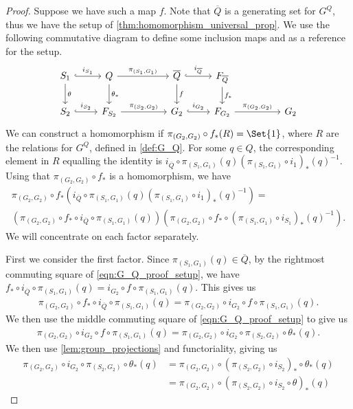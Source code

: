 \begin{proof}
	Suppose we have such a map $f$.
	Note that  $\overline{Q}$ is a generating set for  $G^Q$, thus we have the setup of \cref{thm:homomorphism_universal_prop}.
	We use the following commutative diagram to define some inclusion maps and as a reference for the setup.
	\begin{equation}
		\begin{tikzcd}
			S_1 \ar[d, "\theta"] \ar[r, hook, "i_{S_1}"] & Q \ar[d, "\theta_*"] \ar[rr, "\pi_{(S_1, G_1)}"] & & \overline{Q} \ar[d, "f"] \ar[r, hook, "i_{\overline{Q}}"] & F_{\overline{Q}} \ar[d, "f_*"]
			\\ S_2 \ar[r, hook, "i_{S_2}"] & F_{S_2} \ar[rr, "\pi_{(S_2, G_2)}"] & & G_2 \ar[r, hook, "i_{G_2}"] & F_{G_2} \ar[rr, "\pi_{(G_2, G_2)}"] & & G_2
		\end{tikzcd}
		\label{eqn:G_Q_proof_setup}
	\end{equation}
	We can construct a homomorphism if $\pi_{(G_2, G_2)} \circ f_*(R) = \Set{1}$, where $R$ are the relations for $G^Q$, defined in \cref{def:G_Q}.
	For some $q \in Q$, the corresponding element in $R$ equalling the identity is  $i_{\overline{Q}} \circ \pi_{(S_1,G_1)}(q)(\pi_{(S_1,G_1)} \circ i_1)_*(q)^{-1}$.
	Using that $\pi_{(G_2,G_2)} \circ f_*$ is a homomorphism, we have
	\begin{align*}
		\pi_{(G_2,G_2)} \circ f_* \left(i_{\overline{Q}} \circ \pi_{(S_1,G_1)}(q)(\pi_{(S_1,G_1)} \circ i_1)_*(q)^{-1}\right) =
		\\ \left(\pi_{(G_2,G_2)} \circ f_* \circ i_{\overline{Q}} \circ \pi_{(S_1,G_1)} (q)\right) \left( \pi_{(G_2,G_2)} \circ f_* \circ\left( \pi_{(S_1,G_1)} \circ i_{S_1}\right)_*(q)^{-1} \right).
	\end{align*}
	We will concentrate on each factor separately.

	First we consider the first factor.
	Since $\pi_{(S_1, G_1)}(q) \in \overline{Q}$, by the rightmost commuting square of \eqref{eqn:G_Q_proof_setup}, we have $f_* \circ i_{\overline{Q}} \circ \pi_{(S_1, G_1)}(q) = i_{G_2} \circ f \circ \pi_{(S_1,G_1)} (q)$.
	This gives us
	\begin{align*}
		\pi_{(G_2,G_2)} \circ f_* \circ i_{\overline{Q}} \circ \pi_{(S_1,G_1)} (q) = \pi_{(G_2,G_2)} \circ i_{G_2} \circ f \circ \pi_{(S_1,G_1)}(q).
	\end{align*}
	We then use the middle commuting square of \eqref{eqn:G_Q_proof_setup} to give us
	\begin{align*}
		\pi_{(G_2,G_2)} \circ i_{G_2} \circ f \circ \pi_{(S_1,G_1)}(q) = \pi_{(G_2,G_2)} \circ i_{G_2} \circ \pi_{(S_2,G_2)} \circ \theta_*(q).
	\end{align*}
	We then use \cref{lem:group_projections} and functoriality, giving us
	\begin{align*}
		\pi_{(G_2,G_2)} \circ i_{G_2} \circ \pi_{(S_2,G_2)} \circ \theta_*(q) & = \pi_{(G_2,G_2)} \circ \left( \pi_{(S_2,G_2)} \circ i_{S_2} \right)_*  \circ \theta_*(q)
		\\ &= \pi_{(G_2,G_2)} \circ \left( \pi_{(S_2,G_2)} \circ i_{S_2} \circ \theta \right)_*(q)
	\end{align*}


\end{proof}
